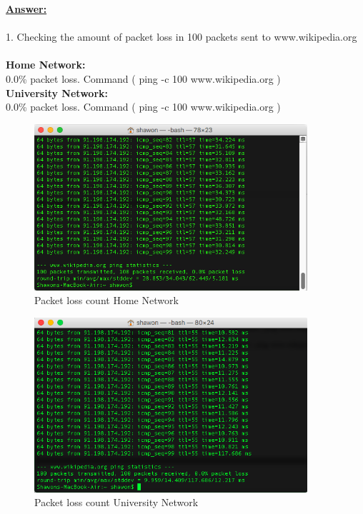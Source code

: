 \documentclass{WeSTassignment}
\begin{document}
\underline{\textbf{Answer:}}\\ \\
\textrm{1. Checking the amount of packet loss in 100 packets sent to www.wikipedia.org}\\ \\
\textbf{Home Network:\\}
0.0\% packet loss. Command ( ping -c 100 www.wikipedia.org )\\
\textbf{University Network:\\}
0.0\% packet loss. Command ( ping -c 100 www.wikipedia.org )\\ 
\begin{figure}[bp!]
  \centering
  \includegraphics[width=0.9\textwidth]{home_ping.png}
   \caption{Packet loss count Home Network}
     \label{fig:packetloss}
\end{figure}
\begin{figure}[bp!]
  \centering
  \includegraphics[width=0.9\textwidth]{uni_ping.png}
   \caption{Packet loss count University Network}
     \label{fig:packetloss}
\end{figure}\\
\end{document}
